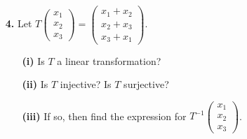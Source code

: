 \documentclass[ 12pt ]{article}
\begin{document}
\begin{enumerate}
		\begin{proof}
			\begin{enumerate}
				\item[\textbf{(i)}] True. Suppose for every $\vec{x} \in \mathbb{R}^n$, $A\vec{x} = B\vec{x}$ for $m \times n$ matrices $A$, $B$. Let
					$T : \mathbb{R}^n \to \mathbb{R}^m$ such that $T(\vec{x}) = A\vec{x} = B\vec{x}$. We know that there exists a unique matrix that defines the transformation $T$.
					Moreover, this uniqueness instists that $A = B$.
				\item[\textbf{(ii)}] False. As a counter-example, suppose that $A = 0_{n \times n}$ and $B = I_n$. Then $AB = 0_{n \times n}$, where the columns of $AB$ are
					$\vec{0}$, clearly linearly dependent.
			\end{enumerate}
		\end{proof}


	\item[\textbf{4.}] Let $T \begin{pmatrix} x_1 \\ x_2 \\ x_3 \end{pmatrix} = \begin{pmatrix} x_1 + x_2 \\ x_2 + x_3 \\ x_3 + x_1 \end{pmatrix}$.
		\begin{enumerate}
			\item[\textbf{(i)}] Is $T$ a linear transformation?
			\item[\textbf{(ii)}] Is $T$ injective? Is $T$ surjective?
			\item[\textbf{(iii)}] If so, then find the expression for $T^{-1} \begin{pmatrix} x_1 \\ x_2 \\ x_3 \end{pmatrix}$.
		\end{enumerate}


\end{enumerate}
\end{document}
